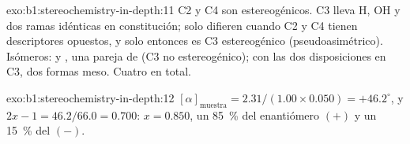\begin{solution}{exo:b1:stereochemistry-in-depth:11}
C2 y C4 son estereogénicos. C3 lleva H, OH y dos ramas idénticas en
constitución; solo difieren cuando C2 y C4 tienen descriptores opuestos,
y solo entonces es C3 estereogénico (pseudoasimétrico). Isómeros:
 y , una pareja de  (C3 no
estereogénico);  con las dos disposiciones en C3, dos formas
meso. Cuatro en total.
\end{solution}

\begin{solution}{exo:b1:stereochemistry-in-depth:12}
$[\alpha]_{\text{muestra}} = 2.31/(1.00 \times 0.050) = +46.2^\circ$, y
$2x - 1 = 46.2/66.0 = 0.700$: $x = 0.850$, un \qty{85}{\percent} del
enantiómero $(+)$ y un \qty{15}{\percent} del $(-)$.
\end{solution}

